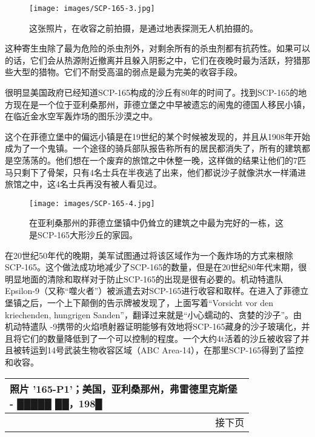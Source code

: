 \begin{figure}[H]
    \centering
    \texttt{[image: images/SCP-165-3.jpg]}
    \caption*{这张照片，在收容之前拍摄，是通过地表探测无人机拍摄的。}
\end{figure}

这种寄生虫除了最为危险的杀虫剂外，对剩余所有的杀虫剂都有抗药性。如果可以的话，它们会从热源附近撤离并且躲入阴影之中，它们在夜晚时最为活跃，狩猎那些大型的猎物。它们不耐受高温的弱点是最为完美的收容手段。

\hr

很明显美国政府已经知道SCP-165构成的沙丘有80年的时间了。找到SCP-165的地方现在是一个位于亚利桑那州，菲德立堡之中早被遗忘的闹鬼的德国人移民小镇，在临近金水空军轰炸场的图乐沙漠之中。

这个在菲德立堡中的偏远小镇是在19世纪的某个时候被发现的，并且从1908年开始成为了一个鬼镇。一个途径的骑兵部队报告称所有的居民都消失了，所有的建筑都是空荡荡的。他们想在一个废弃的旅馆之中休整一晚，这样做的结果让他们的7匹马只剩下了骨架，只有4名士兵在半夜逃了出来，他们都说沙子就像洪水一样涌进旅馆之中，这4名士兵再没有被人看见过。

\begin{figure}[H]
    \centering
    \texttt{[image: images/SCP-165-4.jpg]}
    \caption*{在亚利桑那州的菲德立堡镇中仍耸立的建筑之中最为完好的一栋，这是SCP-165大形沙丘的家园。}
\end{figure}

在20世纪50年代的晚期，美军试图通过将该区域作为一个轰炸场的方式来根除SCP-165。这个做法成功地减少了SCP-165的数量，但是在20世纪80年代末期，很明显地面的清除和取样对于防止SCP-165的出现是很有必要的。机动特遣队Epsilon-9（又称“噬火者”）被派遣去对SCP-165进行收容和取样。在进入了菲德立堡镇之后，一个上下颠倒的告示牌被发现了，上面写着“Vorsicht vor den kriechenden, hungrigen Sanden”，翻译过来就是“小心蠕动的、贪婪的沙子”。由机动特遣队 -9携带的火焰喷射器证明能够有效地将SCP-165藏身的沙子玻璃化，并且将它们的数量降低到了一个可以控制的程度。一个大约4t活着的沙丘被收容了并且被转运到14号武装生物收容区域（ABC Area-14），在那里SCP-165得到了监控和收容。



\begin{longtable}{|m{0.8\linewidth}|}
    \hline
    \multicolumn{1}{|l|}{照片 '165-P1'；美国，亚利桑那州，弗雷德里克斯堡 - █████ ██，198█}\\
    \hline
    \endhead
    \hline\multicolumn{1}{r}{\small{接下页}}
    \endfoot
    \hline
    \endlastfoot
    \raisebox{-.5\height}{\texttt{[image: images/SCP-165-5.jpg]}}
\end{longtable}

